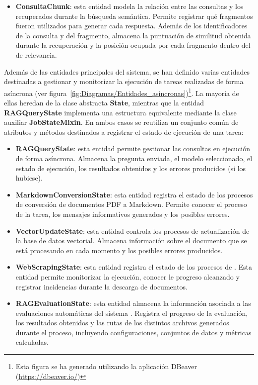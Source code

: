 \begin{itemize}
	\item \textbf{ConsultaChunk}: esta entidad modela la relación entre las consultas y los  recuperados durante la búsqueda semántica. Permite registrar qué fragmentos fueron utilizados para generar cada respuesta. Además de los identificadores de la consulta y del fragmento, almacena la puntuación de similitud obtenida durante la recuperación y la posición ocupada por cada fragmento dentro del  de relevancia.
\end{itemize}


Además de las entidades principales del sistema, se han definido varias entidades destinadas a gestionar y monitorizar la ejecución de tareas realizadas de forma asíncrona (ver figura~\ref{fig:Diagramas/Entidades_asincronas})\footnote{Esta figura se ha generado utilizando la aplicación DBeaver (\href{https://dbeaver.io/}{https://dbeaver.io/})}. La mayoría de ellas heredan de la clase abstracta \textbf{State}, mientras que la entidad \textbf{RAGQueryState} implementa una estructura equivalente mediante la clase auxiliar \textbf{JobStateMixin}. En ambos casos se reutiliza un conjunto común de atributos y métodos destinados a registrar el estado de ejecución de una tarea:

\begin{itemize}
	\item \textbf{RAGQueryState}: esta entidad permite gestionar las consultas en ejecución de forma asíncrona. Almacena la pregunta enviada, el modelo seleccionado,  el estado de ejecución, los resultados obtenidos y los errores producidos (si los hubiese). 
	\item \textbf{MarkdownConversionState}: esta entidad registra el estado de los procesos de conversión de documentos PDF a Markdown. Permite conocer el proceso de la tarea, los mensajes informativos generados y los posibles errores.
	\item \textbf{VectorUpdateState}: esta entidad controla los procesos de actualización de la base de datos vectorial. Almacena información sobre el documento que se está procesando en cada momento y los posibles errores producidos.
	\item \textbf{WebScrapingState}: esta entidad registra el estado de los procesos de . Esta entidad permite monitorizar la ejecución, conocer le progreso alcanzado y registrar incidencias durante la descarga de documentos.
	\item \textbf{RAGEvaluationState}: esta entidad almacena la información asociada a las evaluaciones automáticas del sistema . Registra el progreso de la evaluación, los resultados obtenidos y las rutas de los distintos archivos generados durante el proceso, incluyendo configuraciones, conjuntos de datos y métricas calculadas.
\end{itemize}

